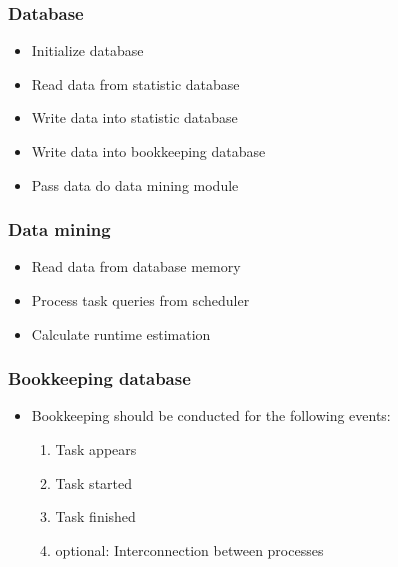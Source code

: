 {	\subsubsection{Database}
	
		\begin{itemize}
			\item Initialize database
			\item Read data from statistic database
			\item Write data into statistic database
			\item Write data into bookkeeping database
			\item Pass data do data mining module
		\end{itemize}
		
		\subsubsection{Data mining}
	
			\begin{itemize}
				\item Read data from database memory
				\item Process task queries from scheduler
				\item Calculate runtime estimation 
			\end{itemize}
	
	
		
		
		\subsubsection{Bookkeeping database}
	
			\begin{itemize}
				\item Bookkeeping should be conducted for the following events:
				\begin{enumerate}
					\item Task appears
					\item Task started
					\item Task finished 
					\item optional: Interconnection between processes
				\end{enumerate}
			\end{itemize}
	
}

